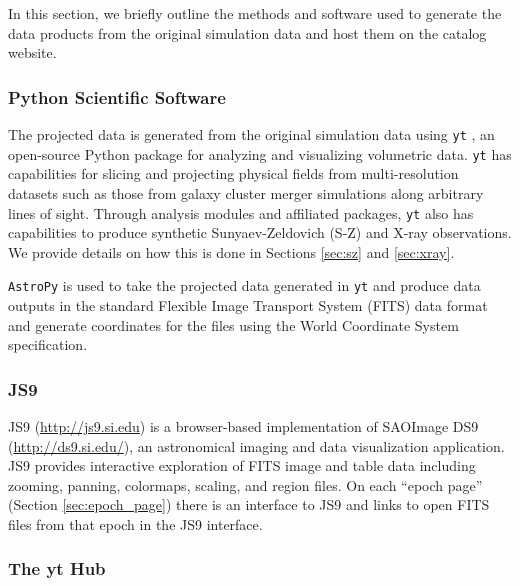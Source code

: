 \documentclass{emulateapj}
\newcommand{\code}[1]{\texttt{#1}}
\begin{document}
In this section, we briefly outline the methods and software used to generate the data products from the original simulation data and host them on the catalog website.

\subsubsection{Python Scientific Software}\label{sec:software}

The projected data is generated from the original simulation data using \code{yt} \citep{tur11}, an open-source Python package for analyzing and visualizing volumetric data. \code{yt} has capabilities for slicing and projecting physical fields from multi-resolution datasets such as those from galaxy cluster merger simulations along arbitrary lines of sight. Through analysis modules and affiliated packages, \code{yt} also has capabilities to produce synthetic Sunyaev-Zeldovich (S-Z) and X-ray observations. We provide details on how this is done in Sections \ref{sec:sz} and \ref{sec:xray}.

\code{AstroPy} \citep{apy13} is used to take the projected data generated in \code{yt} and produce data outputs in the standard Flexible Image Transport System (FITS) data format \citep{pen10} and generate coordinates for the files using the World Coordinate System \citep[WCS,][]{gre02, cal02} specification.

\subsubsection{JS9}\label{sec:js9}

JS9 (\url{http://js9.si.edu}) is a browser-based implementation of SAOImage DS9 (\url{http://ds9.si.edu/}), an astronomical imaging and data visualization application. JS9 provides interactive exploration of FITS image and table data including zooming, panning, colormaps, scaling, and region files. On each ``epoch page'' (Section \ref{sec:epoch_page}) there is an interface to JS9 and links to open FITS files from that epoch in the JS9 interface.

\subsubsection{The yt Hub}\label{sec:yt_hub}
\end{document}

